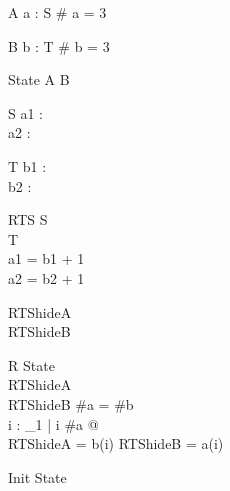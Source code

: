 \begin{schema}{A}
a : \seq S
\where
\# a = 3
\end{schema}

\begin{schema}{B}
b : \seq T
\where
\# b = 3
\end{schema}

\begin{zed}
State  A \land B
\end{zed}

\begin{schema}{S}
a1 : \nat\\
a2 : \nat
\end{schema}

\begin{schema}{T}
b1 : \nat\\
b2 : \nat
\end{schema}

\begin{schema}{RTS}
S\\
T\\
\where
a1 = b1 + 1\\
a2 = b2 + 1
\end{schema}

\begin{zed}
RTShideA \\
RTShideB 
\end{zed}

%
%
\begin{schema}{R}
State\\
RTShideA\\
RTShideB
\where
\#a = \#b\\
\forall i : \nat_1 | i \leq \#a @ \\
      \theta RTShideA = b(i) \land \theta RTShideB = a(i)
\end{schema}

\begin{schema}{Init}
State
\where
[S ; T | R]
\end{schema}
